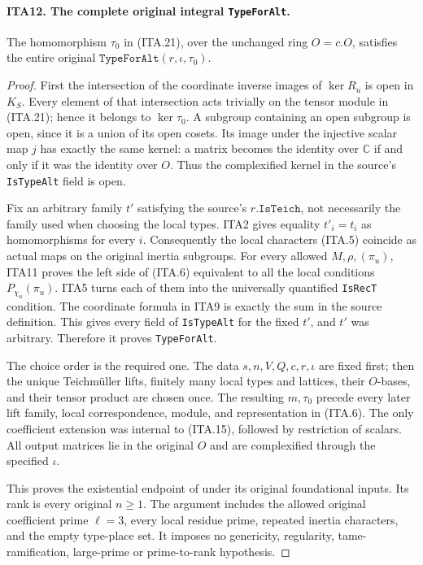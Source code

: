 \paragraph{ITA12. The complete original integral \texttt{TypeForAlt}.}
\label{claim:ITA12}
The homomorphism $\tau_0$ in (ITA.21), over the unchanged
ring $O=c.O$, satisfies the entire original
$\texttt{TypeForAlt}(r,\iota,\tau_0)$.
\begin{proof}
First the intersection of the coordinate inverse images
of $\ker R_u$ is open in $K_S$.  Every element of that
intersection acts trivially on the tensor module in
(ITA.21); hence it belongs to $\ker\tau_0$.
A subgroup containing an open subgroup is open, since
it is a union of its open cosets.  Its image under the
injective scalar map $j$ has exactly the same kernel:
a matrix becomes the identity over $\mathbb C$ if and
only if it was the identity over $O$.  Thus the
complexified kernel in the source's \texttt{IsTypeAlt}
field is open.

Fix an arbitrary family $t'$ satisfying the source's
$r.\texttt{IsTeich}$, not necessarily the family used
when choosing the local types.  ITA2 gives equality
$t'_i=t_i$ as homomorphisms for every $i$.  Consequently
the local characters (ITA.5) coincide as actual maps
on the original inertia subgroups.  For every allowed
$M,\rho,(\pi_u)$, ITA11 proves the left side of
(ITA.6) equivalent to all the local conditions
$P_{\chi_u}(\pi_u)$.  ITA5 turns each of them into
the universally quantified \texttt{IsRecT} condition.
The coordinate formula in ITA9 is exactly the sum in
the source definition.  This gives every field of
\texttt{IsTypeAlt} for the fixed $t'$, and $t'$ was
arbitrary.  Therefore it proves \texttt{TypeForAlt}.

The choice order is the required one.  The data
$s,n,V,Q,c,r,\iota$ are fixed first; then the unique
Teichm\"uller lifts, finitely many local types and
lattices, their $O$-bases, and their tensor product
are chosen once.  The resulting $m,\tau_0$ precede
every later lift family, local correspondence, module,
and representation in (ITA.6).  The only coefficient
extension was internal to (ITA.15), followed by
restriction of scalars.  All output matrices lie in
the original $O$ and are complexified through the
specified $\iota$.

This proves the existential endpoint of
under its original foundational inputs.  Its rank is
every original $n\geq1$.  The argument includes the
allowed original coefficient prime $\ell=3$, every
local residue prime, repeated inertia characters,
and the empty type-place set.  It imposes no
genericity, regularity, tame-ramification, large-prime
or prime-to-rank hypothesis.
\end{proof}


